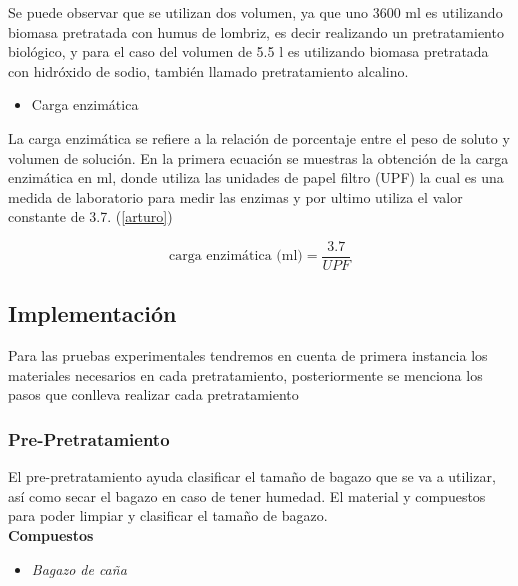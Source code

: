 \documentclass[12pt]{article}
\begin{document}
		
		Se puede observar que se utilizan dos volumen, ya que uno 3600 ml es utilizando biomasa pretratada con humus de lombriz, es decir realizando un pretratamiento biológico, y para el caso del volumen de 5.5 l es utilizando biomasa pretratada con hidróxido de sodio, también llamado pretratamiento alcalino.
		
		
			\begin{itemize}
			\item  Carga enzimática
	     	\end{itemize}
		
		
	La carga enzimática se refiere a la relación de porcentaje entre el peso de soluto y volumen de solución. En la primera ecuación se muestras la obtención de la carga enzimática en ml, donde utiliza las unidades de papel filtro (UPF) la cual es una medida de laboratorio para medir las enzimas y por ultimo utiliza el valor constante de 3.7. (\ref{arturo})
			
	\begin{equation}
		\text{carga enzimática (ml)} = \frac{3.7}{UPF}
	\end{equation}
	
	
	
	

			
		
		
		
		
		
	\newpage
			
			
	
			\subsection{Implementación}

			Para las pruebas experimentales tendremos en cuenta de primera instancia los materiales necesarios en cada pretratamiento, posteriormente se menciona los pasos que conlleva realizar cada pretratamiento
			

			\subsubsection{Pre-Pretratamiento}

			
			El pre-pretratamiento ayuda clasificar el tamaño de bagazo que se va a utilizar, así como secar el bagazo en caso de tener humedad. El material y compuestos para poder limpiar y clasificar el tamaño de bagazo.
			\\[0.5em]
			\textbf{Compuestos} 
			\begin{itemize}[label=\textcolor{blue}{$\bullet$}]
			 \item	\textit{ Bagazo de caña }
			\end{itemize} 
			
\end{document}
